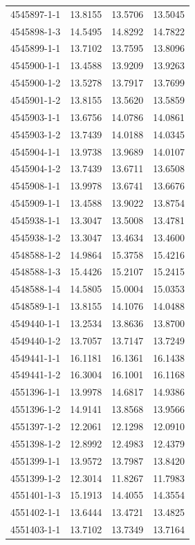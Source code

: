 \begin{longtable}{lrrr}
4545897-1-1 & 13.8155 & 13.5706 & 13.5045 \\
4545898-1-3 & 14.5495 & 14.8292 & 14.7822 \\
4545899-1-1 & 13.7102 & 13.7595 & 13.8096 \\
4545900-1-1 & 13.4588 & 13.9209 & 13.9263 \\
4545900-1-2 & 13.5278 & 13.7917 & 13.7699 \\
4545901-1-2 & 13.8155 & 13.5620 & 13.5859 \\
4545903-1-1 & 13.6756 & 14.0786 & 14.0861 \\
4545903-1-2 & 13.7439 & 14.0188 & 14.0345 \\
4545904-1-1 & 13.9738 & 13.9689 & 14.0107 \\
4545904-1-2 & 13.7439 & 13.6711 & 13.6508 \\
4545908-1-1 & 13.9978 & 13.6741 & 13.6676 \\
4545909-1-1 & 13.4588 & 13.9022 & 13.8754 \\
4545938-1-1 & 13.3047 & 13.5008 & 13.4781 \\
4545938-1-2 & 13.3047 & 13.4634 & 13.4600 \\
4548588-1-2 & 14.9864 & 15.3758 & 15.4216 \\
4548588-1-3 & 15.4426 & 15.2107 & 15.2415 \\
4548588-1-4 & 14.5805 & 15.0004 & 15.0353 \\
4548589-1-1 & 13.8155 & 14.1076 & 14.0488 \\
4549440-1-1 & 13.2534 & 13.8636 & 13.8700 \\
4549440-1-2 & 13.7057 & 13.7147 & 13.7249 \\
4549441-1-1 & 16.1181 & 16.1361 & 16.1438 \\
4549441-1-2 & 16.3004 & 16.1001 & 16.1168 \\
4551396-1-1 & 13.9978 & 14.6817 & 14.9386 \\
4551396-1-2 & 14.9141 & 13.8568 & 13.9566 \\
4551397-1-2 & 12.2061 & 12.1298 & 12.0910 \\
4551398-1-2 & 12.8992 & 12.4983 & 12.4379 \\
4551399-1-1 & 13.9572 & 13.7987 & 13.8420 \\
4551399-1-2 & 12.3014 & 11.8267 & 11.7983 \\
4551401-1-3 & 15.1913 & 14.4055 & 14.3554 \\
4551402-1-1 & 13.6444 & 13.4721 & 13.4825 \\
4551403-1-1 & 13.7102 & 13.7349 & 13.7164 \\

\end{longtable}
